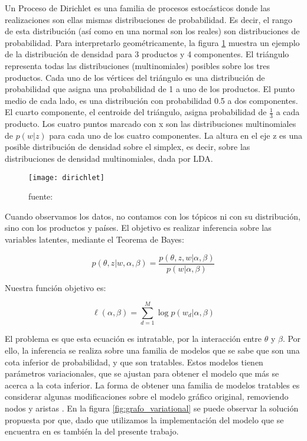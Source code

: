 \documentclass[class=article, crop=false]{standalone}
\begin{document}
Un Proceso de Dirichlet es una familia de procesos estocásticos donde las realizaciones son ellas mismas distribuciones de probabilidad. Es decir, el rango de esta distribución (así como en una normal son los reales) son distribuciones de probabilidad. Para interpretarlo geométricamente, la figura \ref{fig:dirichlet} muestra un ejemplo de la distribución de densidad para 3 productos y 4 componentes. El triángulo representa todas las distribuciones (multinomiales)
posibles sobre los tres productos. Cada uno de los vértices del triángulo es una distribución de probabilidad que asigna una probabilidad de 1 a uno de los productos. El punto medio de cada lado, es una distribución con probabilidad 0.5 a dos componentes. El cuarto componente, el centroide del triángulo, asigna probabilidad de $\frac{1}{3}$ a cada producto. Los cuatro puntos marcado con x son las distribuciones multinomiales de $p(w|z)$  para cada uno de los cuatro componentes. La altura en el eje z es una posible distribución de densidad sobre el
simplex, es decir, sobre las distribuciones de densidad multinomiales, dada por LDA.

\begin{figure}
	\centering	
	\texttt{[image: dirichlet]}
	\caption{fuente: \cite{blei2003latent}}
	\label{fig:dirichlet}
\end{figure}

Cuando observamos los datos, no contamos con los tópicos ni con su
distribución, sino con los productos y países. El objetivo es realizar
inferencia sobre las variables latentes, mediante el Teorema de Bayes:

$$
p(\theta,z|w,\alpha,\beta) = \frac{p(\theta,z,w|\alpha,\beta)}{p(w|\alpha,\beta)}
$$

Nuestra función objetivo es:

$$
\ell(\alpha, \beta) = \sum_{d=1}^M \log p(w_d|\alpha,\beta)
$$

El problema es que esta ecuación es intratable, por la interacción entre $\theta$ y $\beta$. Por ello, la inferencia se realiza sobre una familia de modelos que se sabe que son una cota inferior de probabilidad, y que son tratables. Estos modelos tienen parámetros variacionales, que se ajustan para obtener el modelo que más se acerca a la cota inferior. La forma de obtener una familia de modelos tratables es considerar algunas modificaciones sobre el modelo gráfico original, removiendo nodos y aristas \citep{hoffman2013stochastic}. En la figura \ref{fig:grafo_variational} se puede observar la solución propuesta por \citep{blei2003latent} que, dado que utilizamos la implementación del modelo que se encuentra en \cite{scikit-learn} es también la del presente trabajo.
\end{document}
